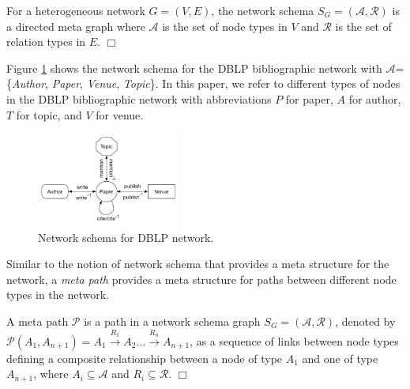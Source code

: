 \begin{definition}For a heterogeneous network $G=(V,E)$, the network schema $S_G=\mathcal{(A,R)}$ is a directed meta graph where $\mathcal{A}$ is the set of node types in $V$ and $\mathcal{R}$ is the set of relation types in $E$.  $\Box$\end{definition}

Figure \ref{schema} shows the network schema for the DBLP bibliographic network with $\mathcal{A}$=\{\textit{Author}, \textit{Paper}, \textit{Venue}, \textit{Topic}\}. In this paper, we refer to different types of nodes in the DBLP bibliographic network with abbreviations $P$ for paper, $A$ for author, $T$ for topic, and $V$ for venue. 

\begin{figure}[t]
\centering
\includegraphics[trim = 0mm 10mm 0mm 0mm,width=0.42\textwidth]{figs/schema.pdf}
\caption{Network schema for DBLP network.}\label{schema}
\end{figure}


Similar to the notion of network schema that provides a meta structure for the network, a \textit{meta path} \cite{sun2011pathsim} provides a meta structure for paths between different node types in the network. 

\begin{definition}A meta path $\mathcal{P}$ is a path in a network schema graph $S_G = (\mathcal{A,R})$, denoted by $\mathcal{P}(A_1,A_{n+1}) = A_1 \xrightarrow{R_1} A_2... \xrightarrow{R_n} A_{n+1}$, as a sequence of links between node types defining a composite relationship between a node of type $A_1$ and one of type $A_{n+1}$, where $A_i \subseteq \mathcal{A}$ and $R_i \subseteq \mathcal{R}$. $\Box$\end{definition}

